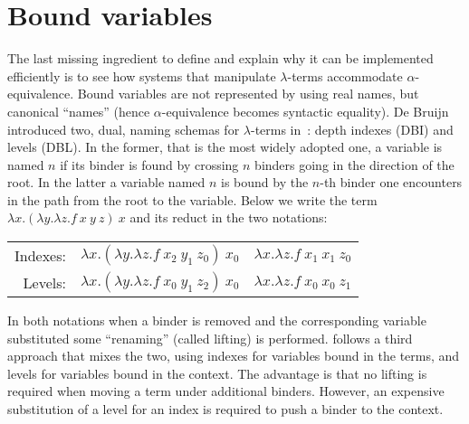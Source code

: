 \documentclass{llncs}
\begin{document}
\section{Bound variables}
\label{sec:dbl}

The last missing ingredient to define \rff{} and explain why it can be
implemented efficiently is to see how systems that manipulate $\lambda$-terms
accommodate
$\alpha$-equivalence. Bound variables are not represented by using
real names, but canonical ``names'' (hence $\alpha$-equivalence becomes syntactic equality).
De Bruijn introduced two, dual, naming schemas for $\lambda$-terms in~\cite{debruijnlevel}:
depth indexes (DBI) and levels
(DBL). In the former, that is the most widely adopted one, a variable is named $n$ if its binder is found by
crossing $n$ binders going in the direction of the root. In the latter a
variable named $n$ is bound by the $n$-th binder one encounters in the path
from the root to the variable.
Below we write the term $\lambda x.(\lambda y.\lambda z.f~x~y~z)~x$ and its reduct in the two notations:
\vspace{-0.5em}
\begin{center}
\begin{tabular}{r@{~~}c@{~$\to_\beta$~}c}
Indexes: & $\lambda x.(\lambda y.\lambda z.f~x_2~y_1~z_0)~x_0$ &
$\lambda x.\lambda z.f~x_1~x_1~z_0$ \\
Levels: & $\lambda x.(\lambda y.\lambda z.f~x_0~y_1~z_2)~x_0$ &
$\lambda x.\lambda z.f~x_0~x_0~z_1$ \\
\end{tabular}
\end{center}
\vspace{-0.5em}
In both notations when a binder is removed and the corresponding variable
substituted some ``renaming'' (called lifting) is performed.
\tedius{} follows
a third approach that mixes the two, using indexes for variables bound in
the terms, and levels for variables bound in the context. The advantage
is that no lifting is required when moving a term under additional binders.
However, an expensive substitution of a level for an index is
required to push a binder to the context.
\end{document}
